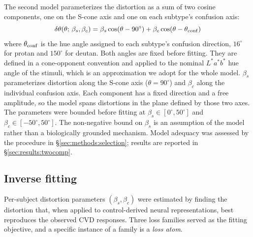 The second model parameterizes the distortion as a sum of two cosine components, one on the S-cone axis and one on each subtype's confusion axis:
%
\begin{equation}
  \delta\theta(\theta;\,\beta_s,\beta_c)
    = \beta_s\cos(\theta - 90^\circ)
    + \beta_c\cos(\theta - \theta_{\rm conf})
  \label{eq:2comp}
\end{equation}
%
where $\theta_{\rm conf}$ is the hue angle assigned to each subtype's confusion direction, $16^\circ$ for protan and $150^\circ$ for deutan. Both angles are fixed before fitting. They are defined in a cone-opponent convention and applied to the nominal $L^{*}a^{*}b^{*}$ hue angle of the stimuli, which is an approximation we adopt for the whole model. $\beta_s$ parameterizes distortion along the S-cone axis ($\theta = 90^\circ$) and $\beta_c$ along the individual confusion axis. Each component has a fixed direction and a free amplitude, so the model spans distortions in the plane defined by those two axes. The parameters were bounded before fitting at $\beta_s \in [0^\circ, 50^\circ]$ and $\beta_c \in [-50^\circ, 50^\circ]$. The non-negative bound on $\beta_s$ is an assumption of the model rather than a biologically grounded mechanism. Model adequacy was assessed by the procedure in \S\ref{sec:methods:selection}; results are reported in \S\ref{sec:results:twocomp}.

\subsection{Inverse fitting}
\label{sec:methods:twocomp}

Per-subject distortion parameters $(\beta_s,\beta_c)$ were estimated by finding the distortion that, when applied to control-derived neural representations, best reproduces the observed CVD responses. Three loss families served as the fitting objective, and a specific instance of a family is a \emph{loss atom}.

